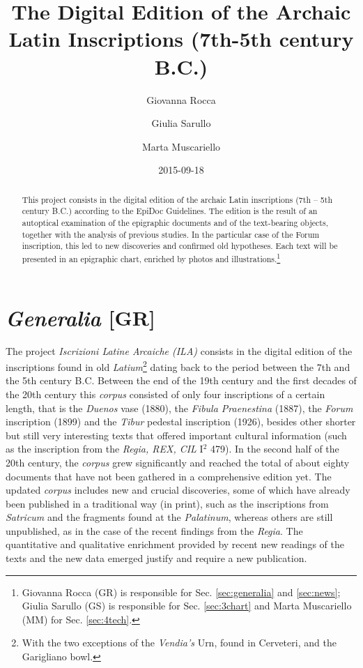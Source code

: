 \documentclass[amsthm,ebook]{saparticle}
\title{The Digital Edition of the Archaic Latin Inscriptions (7th{}-5th century B.C.)}
\author[unimi]{Giovanna Rocca }
\author[kore]{Giulia Sarullo \corref{first}}
\author[unimi]{Marta Muscariello}
\date{2015-09-18}
\begin{document}
\maketitle
\begin{abstract}
This project consists in the digital edition of the archaic Latin inscriptions (7th – 5th century B.C.) according to the
EpiDoc Guidelines. The edition is the result of an autoptical examination of the epigraphic documents and of the
text-bearing objects, together with the analysis of previous studies. In the particular case of the Forum inscription,
this led to new discoveries and confirmed old hypotheses. Each text will be presented in an epigraphic chart, enriched
by photos and illustrations.\footnote{Giovanna Rocca (GR) is responsible for Sec. \ref{sec:generalia} and \ref{sec:news};
Giulia Sarullo (GS) is responsible for Sec. \ref{sec:3chart} and Marta Muscariello (MM) for Sec. \ref{sec:4tech}.}
\end{abstract}







\section{\emph{Generalia} [GR]}\label{sec:generalia}


\noindent The project \emph{Iscrizioni Latine Arcaiche (ILA)} consists in the digital edition of the inscriptions found in old
\emph{Latium}\footnote{With the two exceptions of the \emph{Vendia's} Urn, found in Cerveteri, and the Garigliano bowl.}
dating back to the period between the 7th and the 5th century B.C. Between the end of the 19th century and the first
decades of the 20th century this \emph{corpus} consisted of only four inscriptions of a certain length, that is the \emph{Duenos}
vase (1880), the \emph{Fibula Praenestina} (1887), the \emph{Forum} inscription (1899) and the \emph{Tibur} pedestal inscription (1926),
besides other shorter but still very interesting texts that offered important cultural information (such as the
inscription from the \emph{Regia, REX, CIL} I$^2$ 479). In the second half of the 20th century, the \emph{corpus} grew significantly and
reached the total of about eighty documents that have not been gathered in a comprehensive edition yet. The updated
\emph{corpus} includes new and crucial discoveries, some of which have already been published in a traditional way (in print),
such as the inscriptions from \emph{Satricum} and the fragments found at the \emph{Palatinum}, whereas others are still unpublished,
as in the case of the recent findings from the \emph{Regia}. The quantitative and qualitative enrichment provided by recent
new readings of the texts and the new data emerged justify and require a new publication. 
\end{document}
